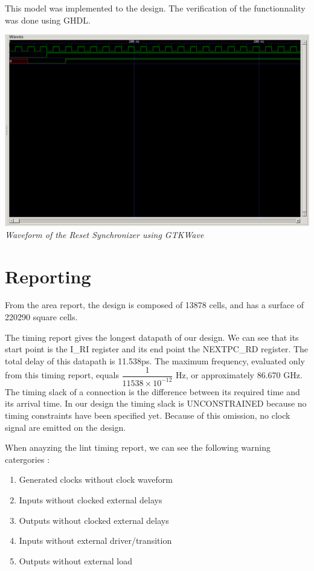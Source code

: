\documentclass[a4paper]{article}
\begin{document}
This model was implemented to the design. The verification of the functionnality was done using GHDL.
\begin{center}
  \includegraphics[width=15cm]{./reset_sync_waveform.png}\\
  {\it Waveform of the Reset Synchronizer using GTKWave}
\end{center}

\newpage


\newpage

\section{Reporting}
From the area report, the design is composed of 13878 cells, and has a surface of 220290 square cells.

The timing report gives the longest datapath of our design. We can see that its start point is the I\_RI register
and its end point the NEXTPC\_RD register. The total delay of this datapath is 11.538ps.
The maximum frequency, evaluated only from this timing report, equals $\dfrac{1}{11538\times10^{-12}}$ Hz, or
approximately 86.670 GHz.
The timing slack of a connection is the difference between its required time and its arrival time. In our design
the timing slack is UNCONSTRAINED because no timing constraints have been specified yet. Because of this omission,
no clock signal are emitted on the design.

When anayzing the lint timing report, we can see the following warning catergories :
\begin{enumerate}
  \item Generated clocks without clock waveform
  \item Inputs without clocked external delays
  \item Outputs without clocked external delays
  \item Inputs without external driver/transition
  \item Outputs without external load
\end{enumerate}
\end{document}
